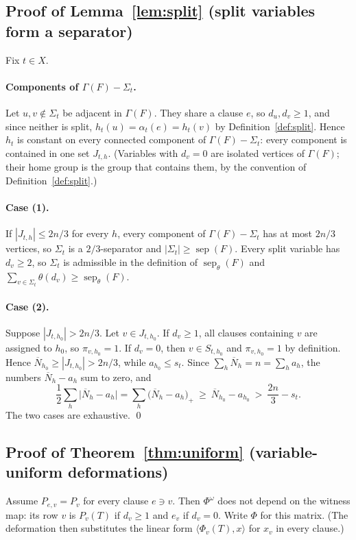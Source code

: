 \documentclass[11pt,a4paper]{article}
\theoremstyle{definition}
\theoremstyle{remark}
\newcommand{\sep}{\operatorname{sep}}
\newcommand{\sepw}{\operatorname{sep}_{\theta}}
\newcommand{\Gr}{\Gamma}
\newcommand{\Nbar}{\overline{N}}
\begin{document}
\subsection{Proof of Lemma~\ref{lem:split} (split variables form a separator)}

Fix $t\in X$.

\paragraph{Components of $\Gr(F)-\Sigma_t$.} Let $u,v\notin\Sigma_t$ be adjacent in
$\Gr(F)$. They share a clause $e$, so $d_u,d_v\ge1$, and since neither is split,
$h_t(u)=\alpha_t(e)=h_t(v)$ by Definition~\ref{def:split}. Hence $h_t$ is constant on every
connected component of $\Gr(F)-\Sigma_t$: every component is contained in one set $J_{t,h}$.
(Variables with $d_v=0$ are isolated vertices of $\Gr(F)$; their home group is the group
that contains them, by the convention of Definition~\ref{def:split}.)

\paragraph{Case (1).} If $|J_{t,h}|\le2n/3$ for every $h$, every component of
$\Gr(F)-\Sigma_t$ has at most $2n/3$ vertices, so $\Sigma_t$ is a $2/3$-separator and
$|\Sigma_t|\ge\sep(F)$. Every split variable has $d_v\ge2$, so $\Sigma_t$ is admissible in
the definition of $\sepw(F)$ and $\sum_{v\in\Sigma_t}\theta(d_v)\ge\sepw(F)$.

\paragraph{Case (2).} Suppose $|J_{t,h_0}|>2n/3$. Let $v\in J_{t,h_0}$. If $d_v\ge1$, all
clauses containing $v$ are assigned to $h_0$, so $\pi_{v,h_0}=1$. If $d_v=0$, then
$v\in S_{t,h_0}$ and $\pi_{v,h_0}=1$ by definition. Hence
$\Nbar_{h_0}\ge|J_{t,h_0}|>2n/3$, while $a_{h_0}\le s_t$. Since
$\sum_h\Nbar_h=n=\sum_ha_h$, the numbers $\Nbar_h-a_h$ sum to zero, and
\[
\frac12\sum_h\bigl|\Nbar_h-a_h\bigr|=\sum_h\bigl(\Nbar_h-a_h\bigr)_+\ \ge\ \Nbar_{h_0}-a_{h_0}
\ >\ \frac{2n}{3}-s_t .
\]
The two cases are exhaustive. \qed

\subsection{Proof of Theorem~\ref{thm:uniform} (variable-uniform deformations)}

Assume $P_{e,v}=P_v$ for every clause $e\ni v$. Then $\Phi^\omega$ does not depend on the
witness map: its row $v$ is $P_v(T)$ if $d_v\ge1$ and $e_v$ if $d_v=0$. Write $\Phi$ for
this matrix. (The deformation then substitutes the linear form $\langle\Phi_v(T),x\rangle$
for $x_v$ in every clause.)
\end{document}
